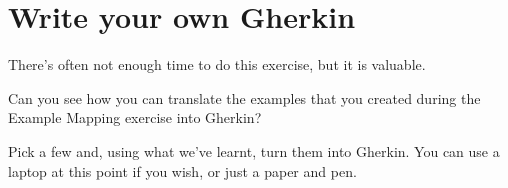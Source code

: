 \section*{Write your own Gherkin}

\ifnotes

    There's often not enough time to do this exercise, but it is valuable.

\fi 


\ifcontent

    Can you see how you can translate the examples that you created during the Example Mapping exercise into Gherkin? 
    
    Pick a few and, using what we've learnt, turn them into Gherkin. You can use a laptop at this point if you wish, or just a paper and pen.
    
    
\fi